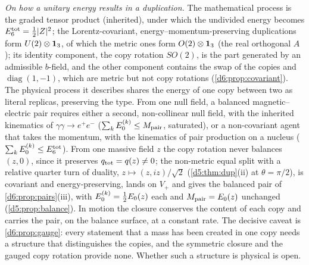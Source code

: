 \emph{On how a unitary energy results in a duplication.} The mathematical process is the graded tensor product (inherited), under which the
undivided energy becomes $E_6^{\rm tot}=\tfrac12|Z|^2$; the Lorentz-covariant, energy--momentum-preserving duplications form $U(2)\otimes\mathbf 1_3$, of
which the metric ones form $O(2)\otimes\mathbf 1_3$ (the real orthogonal $A$); its identity component, the copy rotation $SO(2)$, is the part generated by an admissible $b$-field, and the other component contains the swap of the copies and $\operatorname{diag}(1,-1)$, which are metric but not copy rotations (\cref{d6:prop:covariant}). The physical process it
describes shares the energy of one copy between two as literal replicas, preserving the type. From one null field, a balanced magnetic--electric pair requires either
a second, non-collinear null field, with the inherited kinematics of $\gamma\gamma\to e^+e^-$ ($\sum_kE_0^{(k)}\le M_{\rm pair}$, saturated), or a
non-covariant agent that takes the momentum, with the kinematics of pair production on a nucleus ($\sum_kE_0^{(k)}\le E_6^{\rm tot}$). From one massive field $z$ the copy rotation never balances $(z,0)$, since it preserves $q_{\rm tot}=q(z)\neq0$; the non-metric equal split with a relative quarter turn of duality, $z\mapsto(z,iz)/\sqrt2$ (\cref{d5:thm:dup}(ii) at $\theta=\pi/2$), is covariant and energy-preserving, lands on $V_+$ and gives the balanced pair of \cref{d6:prop:pairs}(iii), with $E_0^{(k)}=\tfrac12 E_0(z)$ each and $M_{\rm pair}=E_0(z)$ unchanged (\cref{d5:prop:balance}). In motion
the closure conserves the content of each copy and carries the pair, on the balance surface, at a constant rate. The decisive caveat is
\cref{d6:prop:gauge}: every statement that a mass has been created in one copy needs a structure that distinguishes the copies, and the
symmetric closure and the gauged copy rotation provide none. Whether such a structure is physical is open.

